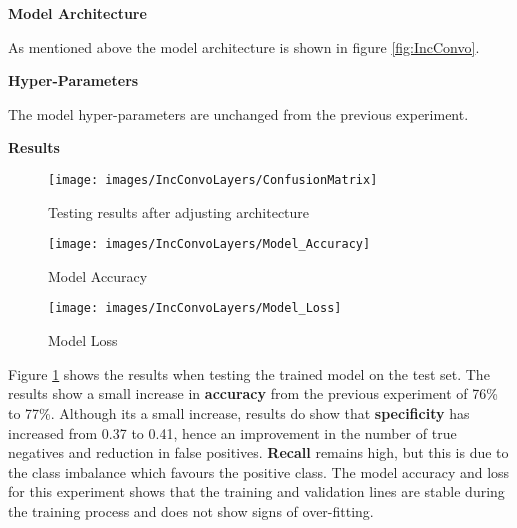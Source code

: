 \textbf{Model Architecture}

As mentioned above the model architecture is shown in figure \ref{fig:IncConvo}. 

\textbf{Hyper-Parameters}

The model hyper-parameters are unchanged from the previous experiment. 

\textbf{Results}

\begin{figure}[H]
	\centering
	\hspace{-1cm}
	\texttt{[image: images/IncConvoLayers/ConfusionMatrix]}
	\caption{Testing results after adjusting architecture}
	\label{fig:exp_IncConvo}
\end{figure}

\begin{figure}[H]
	\begin{minipage}[t]{7.2cm}
		\begin{center}
			\texttt{[image: images/IncConvoLayers/Model\_Accuracy]}
			\caption{Model Accuracy}
			\label{fig:exp_IncConvo_ModelAccuracy}
		\end{center}
	\end{minipage}
	\hfill
	\begin{minipage}[t]{7.2cm}
		\begin{center}
			\texttt{[image: images/IncConvoLayers/Model\_Loss]}
			\caption{Model Loss}
			\label{fig:exp_IncConvo_ModelLoss}
		\end{center}
	\end{minipage}
\end{figure}

Figure \ref{fig:exp_IncConvo} shows the results when testing the trained model on the test set. The results show a small increase in \textbf{accuracy} from the previous experiment of 76\% to 77\%. Although its a small increase, results do show that \textbf{specificity} has increased from 0.37 to 0.41, hence an improvement in the number of true negatives and reduction in false positives. \textbf{Recall} remains high, but this is due to the class imbalance which favours the positive class. The model accuracy and loss for this experiment shows that the training and validation lines are stable during the training process and does not show signs of over-fitting. 





